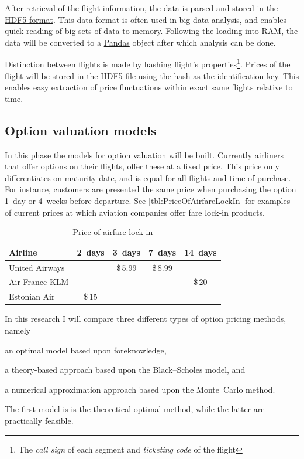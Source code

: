 After retrieval of the flight information, the data is parsed and stored in the \href{http://www.hdfgroup.org/HDF5/}{HDF5-format}. This data format is often used in big data analysis, and enables quick reading of big sets of data to memory. Following the loading into RAM, the data will be converted to a \href{http://pandas.pydata.org/}{Pandas} object after which analysis can be done.

Distinction between flights is made by hashing flight's  properties\footnote{The \emph{call sign} of each segment and \emph{ticketing code} of the flight}. Prices of the flight will be stored in the HDF5-file using the hash as the identification key. This enables easy extraction of price fluctuations within exact same flights relative to time.

\subsection{Option valuation models}
\label{subsec:OptionValuationModels}


In this phase the models for option valuation will be built. Currently airliners that offer options on their flights, offer these at a fixed price. This price only differentiates on maturity date, and is equal for all flights and time of purchase. For instance, customers are presented the same price when purchasing the option 1~day or 4~weeks before departure. See \autoref{tbl:PriceOfAirfareLockIn} for examples of current prices at which aviation companies offer fare lock-in products.

\begin{table}[ht]
	\centering
	\begin{tabular}{l  c  c  c  c}
	\hline \hline
	Airline         & 2~days & 3~days  & 7~days  & 14~days \\ \hline
	United Airways  &        & \$\,5.99 & \$\,8.99 & 	       \\
	Air France-KLM  &        &         &         & \$\,20   \\
	Estonian Air    & \$\,15   &         &         &         \\
	\hline
	\end{tabular}
	\caption{Price of airfare lock-in}
	\label{tbl:PriceOfAirfareLockIn}
\end{table}

In this research I will compare three different types of option pricing methods, name\-ly \begin{inparaenum}
\item an optimal model based upon foreknowledge,
\item a theory-based approach based upon the Black--Scholes model, and
\item a numerical approximation approach based upon the Monte~Carlo method.
\end{inparaenum} The first model is is the theoretical optimal method, while the latter are practically feasible.


